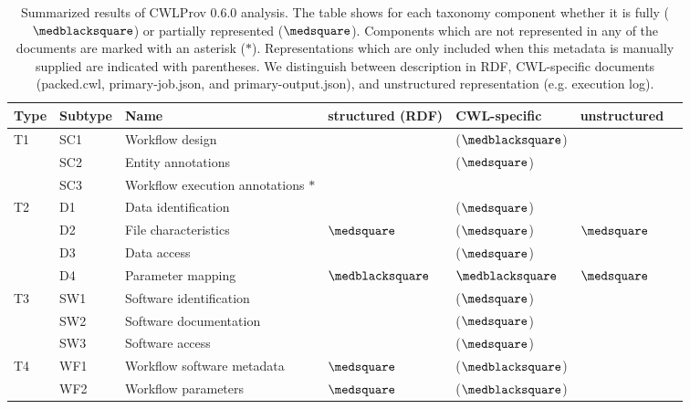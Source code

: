 \begin{table*}[ht!]
\caption{Summarized results of CWLProv 0.6.0 analysis. The table shows for each taxonomy component whether it is fully ($\medblacksquare$) or partially represented ($\medsquare$). Components which are not represented in any of the documents are marked with an asterisk ($\ast$). Representations which are only included when this metadata is manually supplied are indicated with parentheses. We distinguish between description in RDF, CWL-specific documents (packed.cwl, primary-job.json, and primary-output.json), and unstructured representation (e.g. execution log).}
\label{tab:analysis_res}

\begin{tabularx}{\linewidth}{l l L l l l l}
\toprule
{Type} & {Subtype} & {Name} & {structured (RDF)} & {CWL-specific} & {unstructured}  \\
\midrule
T1  & SC1   & Workflow design                   & ~    & ($\medblacksquare$) & ~  \\
    & SC2   & Entity annotations                & ~    & ($\medsquare$) & ~  \\
    & SC3   & Workflow execution annotations $\ast$   &      \\
\midrule
T2  & D1    & Data identification               & ~     & ($\medsquare$) & ~ \\
    & D2    & File characteristics              & $\medsquare$     &  ($\medsquare$)   & $\medsquare$ \\
    & D3    & Data access                       & ~ & ($\medsquare$) & ~ \\
    & D4    & Parameter mapping                 & $\medblacksquare$ & $\medblacksquare$ & $\medsquare$ \\
\midrule
T3  & SW1   & Software identification           & ~ & ($\medsquare$)  & ~  \\
    & SW2   & Software documentation            & ~ & ($\medsquare$)  & ~ \\
    & SW3   & Software access                   & ~ & ($\medsquare$)  & ~  \\
\midrule
T4  & WF1   & Workflow software metadata        & $\medsquare$ & ($\medblacksquare$)  & ~ \\
    & WF2   & Workflow parameters               & $\medsquare$ & ($\medblacksquare$)  & ~    \\

\end{tabularx}
\end{table*}

